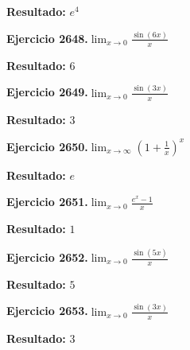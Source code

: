 \documentclass[10pt,a4paper]{article}
\begin{document}
\begin{solbox}
\textbf{Resultado:} \(\displaystyle e^{4}\)
\end{solbox}

\begin{ejbox}
\textbf{Ejercicio 2648.}\quad $\lim_{x\to 0} \frac{\sin(6x)}{x}$
\end{ejbox}

\begin{solbox}
\textbf{Resultado:} \(\displaystyle 6\)
\end{solbox}

\newpage
\begin{ejbox}
\textbf{Ejercicio 2649.}\quad $\lim_{x\to 0} \frac{\sin(3x)}{x}$
\end{ejbox}

\begin{solbox}
\textbf{Resultado:} \(\displaystyle 3\)
\end{solbox}

\begin{ejbox}
\textbf{Ejercicio 2650.}\quad $\lim_{x\to \infty} \left(1+\frac{1}{x}\right)^x$
\end{ejbox}

\begin{solbox}
\textbf{Resultado:} \(\displaystyle e\)
\end{solbox}

\begin{ejbox}
\textbf{Ejercicio 2651.}\quad $\lim_{x\to 0} \frac{e^x-1}{x}$
\end{ejbox}

\begin{solbox}
\textbf{Resultado:} \(\displaystyle 1\)
\end{solbox}

\newpage
\begin{ejbox}
\textbf{Ejercicio 2652.}\quad $\lim_{x\to 0} \frac{\sin(5x)}{x}$
\end{ejbox}

\begin{solbox}
\textbf{Resultado:} \(\displaystyle 5\)
\end{solbox}

\begin{ejbox}
\textbf{Ejercicio 2653.}\quad $\lim_{x\to 0} \frac{\sin(3x)}{x}$
\end{ejbox}

\begin{solbox}
\textbf{Resultado:} \(\displaystyle 3\)
\end{solbox}
\end{document}
